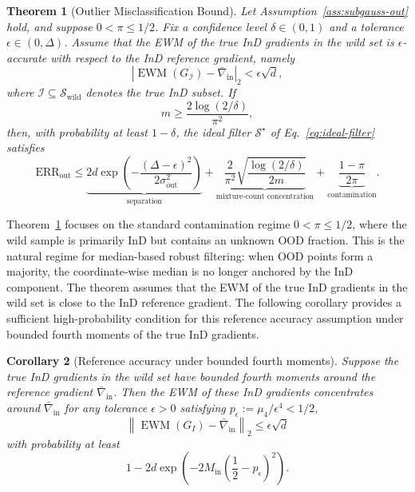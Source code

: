 \documentclass[10pt]{article} %
\theoremstyle{plain}
\newtheorem{theorem}{Theorem}[section]
\newtheorem{corollary}[theorem]{Corollary}
\theoremstyle{definition}
\begin{document}
\begin{tcolorbox}[
  colback=BoxBodyGreen,
  coltitle=black,
  colframe=Primary,
  arc=1.5pt,
  boxrule=1pt,
    left=6pt,right=6pt,top=6pt,bottom=6pt,
    breakable
]
\begin{theorem}[Outlier Misclassification Bound]
\label{thm:outlier_misclassification_bound}
Let Assumption~\ref{ass:subgauss-out} hold, and suppose \(0<\pi\leq 1/2\).
Fix a confidence level \(\delta\in(0,1)\) and a tolerance \(\epsilon\in(0,\Delta)\).
Assume that the EWM of the true InD gradients in the wild set is \(\epsilon\)-accurate
with respect to the InD reference gradient, namely
\[
\left|
\operatorname{EWM}(G_{\mathcal I})-\bar{\nabla}_{\mathrm{in}}
\right|_2
<
\epsilon\sqrt{d},
\]
where \(\mathcal I\subseteq\mathcal S_{\mathrm{wild}}\) denotes the true InD subset.
If
\[
m \geq \frac{2\log(2/\delta)}{\pi^2},
\]
then, with probability at least \(1-\delta\), the ideal filter
\(\mathcal{S}^\star\) of Eq.~\ref{eq:ideal-filter} satisfies
\[
\mathrm{ERR}_{\mathrm{out}}
\leq
\underbrace{2d\exp\left(-\frac{(\Delta-\epsilon)^2}{2\sigma_{\mathrm{out}}^2}\right)}_{\text{separation}}
+
\underbrace{
\frac{2}{\pi^2}\sqrt{\frac{\log(2/\delta)}{2m}}
}_{\text{mixture-count concentration}}
+
\underbrace{\frac{1-\pi}{2\pi}}_{\text{contamination}}.
\]

\end{theorem}
\end{tcolorbox}




Theorem~\ref{thm:outlier_misclassification_bound} focuses on the standard contamination regime \(0<\pi\le 1/2\), where the wild sample is primarily InD but contains an unknown OOD fraction. This is the natural regime for median-based robust filtering: when OOD points form a majority, the coordinate-wise median is no longer anchored by the InD component. The theorem assumes that the EWM of the true InD gradients in the wild set is close to the InD reference gradient. The following corollary provides a sufficient high-probability condition for this reference accuracy assumption under bounded fourth moments of the true InD gradients.


\begin{tcolorbox}[
  colback=BoxBodyGreen,
  coltitle=black,
  colframe=Primary,
  arc=1.5pt,
  boxrule=1pt,
    left=6pt,right=6pt,top=6pt,bottom=6pt,
    breakable
]
\begin{corollary}[Reference accuracy under bounded fourth moments]
\label{cor:ref-acc-moment}
Suppose the true InD gradients in the wild set have bounded fourth moments around the
reference gradient \(\bar{\nabla}_{\mathrm{in}}\). Then the EWM of these InD
gradients concentrates around \(\bar{\nabla}_{\mathrm{in}}\) for any tolerance
\(\epsilon>0\) satisfying \(p_\epsilon:=\mu_4/\epsilon^4<1/2\),
\[
\left\|
\operatorname{EWM}(G_I)-\bar{\nabla}_{\mathrm{in}}
\right\|_2
\leq
\epsilon\sqrt{d}
\]
with probability at least
\[
1-2d\exp\!\left(
-2M_{\mathrm{in}}
\left(
\frac{1}{2}-p_\epsilon
\right)^2
\right).
\]
\end{corollary}
\end{tcolorbox}
\end{document}
